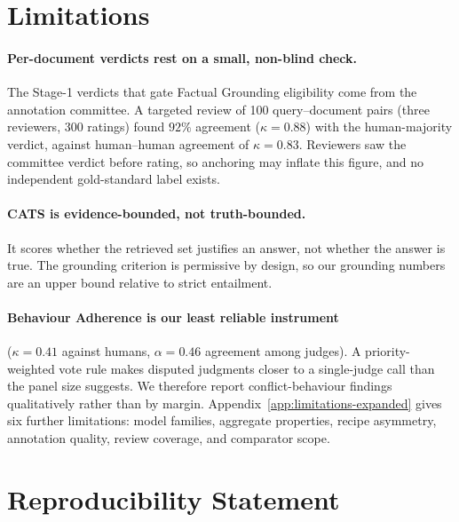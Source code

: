 \section*{Limitations}
\label{sec:limitations}

\paragraph{Per-document verdicts rest on a small, non-blind check.} The
Stage-1 verdicts that gate Factual Grounding eligibility come from the
annotation committee. A targeted review of 100 query--document pairs (three
reviewers, 300 ratings) found $92\%$ agreement ($\kappa=0.88$) with the
human-majority verdict, against human--human agreement of $\kappa=0.83$.
Reviewers saw the committee verdict before rating, so anchoring may inflate
this figure, and no independent gold-standard label exists.

\paragraph{CATS is evidence-bounded, not truth-bounded.} It scores whether the
retrieved set justifies an answer, not whether the answer is true. The
grounding criterion is permissive by design, so our grounding numbers are an
upper bound relative to strict entailment.

\paragraph{Behaviour Adherence is our least reliable instrument}
($\kappa=0.41$ against humans, $\alpha=0.46$ agreement among judges). A priority-weighted vote rule makes disputed
judgments closer to a single-judge call than the panel size suggests. We
therefore report conflict-behaviour findings qualitatively rather than by
margin. Appendix~\ref{app:limitations-expanded} gives six further limitations:
model families, aggregate properties, recipe asymmetry, annotation quality,
review coverage, and comparator scope.

\section*{Reproducibility Statement}

